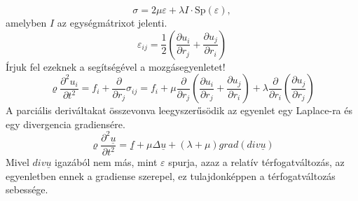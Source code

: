 \documentclass[a4paper,12pt]{article}
\begin{document}
\begin{equation}
\sigma  = 2\mu \varepsilon  + \lambda I \cdot {\text{Sp}}\left( \varepsilon  \right),
\end{equation}
amelyben $I$ az egységmátrixot jelenti.
\begin{equation}
\varepsilon_{ij}=\frac{1}{2}\left(\frac{\partial u_i}{\partial r_j}+\frac{\partial u_j}{\partial r_i}\right)
\end{equation}
Írjuk fel ezeknek a segítségével a mozgásegyenletet!
\begin{equation}
\varrho\frac{\partial^2u_i}{\partial t^2}=f_i+\frac{\partial}{\partial r_j}\sigma_{ij}=
f_i+\mu\frac{\partial}{\partial r_j}\left(\frac{\partial u_i}{\partial r_j}+\frac{\partial u_j}{\partial r_i}\right)+\lambda\frac{\partial}{\partial r_i}\left(\frac{\partial u_j}{\partial r_j}\right)
\end{equation}
A parciális deriváltakat összevonva leegyszerűsödik az egyenlet egy Laplace-ra és egy divergencia gradiensére.
\begin{equation}
\varrho\frac{\partial^2\underline{u}}{\partial t^2}=\underline{f}+\mu\Delta\underline{u}+(\lambda+\mu)grad(div\underline{u})
\end{equation}
Mivel $div\underline{u}$ igazából nem más, mint $\varepsilon$ spurja, azaz a relatív térfogatváltozás, az egyenletben ennek a gradiense szerepel, ez tulajdonképpen a térfogatváltozás sebessége.
\end{document}
